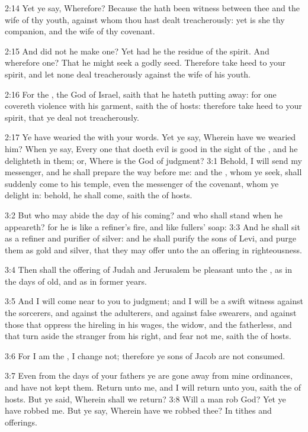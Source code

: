 2:14 Yet ye say, Wherefore? Because the \LORD hath been witness between
thee and the wife of thy youth, against whom thou hast dealt
treacherously: yet is she thy companion, and the wife of thy covenant.

2:15 And did not he make one? Yet had he the residue of the spirit.
And wherefore one? That he might seek a godly seed. Therefore take
heed to your spirit, and let none deal treacherously against the wife
of his youth.

2:16 For the \LORD, the God of Israel, saith that he hateth putting
away: for one covereth violence with his garment, saith the \LORD of
hosts: therefore take heed to your spirit, that ye deal not
treacherously.

2:17 Ye have wearied the \LORD with your words. Yet ye say, Wherein
have we wearied him? When ye say, Every one that doeth evil is good in
the sight of the \LORD, and he delighteth in them; or, Where is the God
of judgment?  3:1 Behold, I will send my messenger, and he shall
prepare the way before me: and the \LORD, whom ye seek, shall suddenly
come to his temple, even the messenger of the covenant, whom ye
delight in: behold, he shall come, saith the \LORD of hosts.

3:2 But who may abide the day of his coming? and who shall stand when
he appeareth? for he is like a refiner's fire, and like fullers' soap:
3:3 And he shall sit as a refiner and purifier of silver: and he shall
purify the sons of Levi, and purge them as gold and silver, that they
may offer unto the \LORD an offering in righteousness.

3:4 Then shall the offering of Judah and Jerusalem be pleasant unto
the \LORD, as in the days of old, and as in former years.

3:5 And I will come near to you to judgment; and I will be a swift
witness against the sorcerers, and against the adulterers, and against
false swearers, and against those that oppress the hireling in his
wages, the widow, and the fatherless, and that turn aside the stranger
from his right, and fear not me, saith the \LORD of hosts.

3:6 For I am the \LORD, I change not; therefore ye sons of Jacob are
not consumed.

3:7 Even from the days of your fathers ye are gone away from mine
ordinances, and have not kept them. Return unto me, and I will return
unto you, saith the \LORD of hosts. But ye said, Wherein shall we
return?  3:8 Will a man rob God? Yet ye have robbed me. But ye say,
Wherein have we robbed thee? In tithes and offerings.

